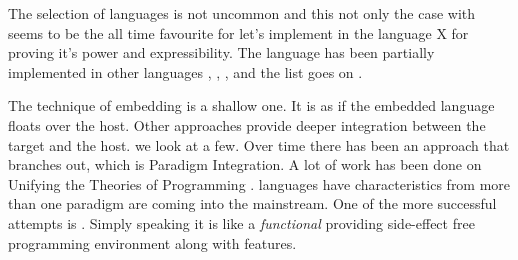 \documentclass[thesis-solanki.tex]{subfiles}
\begin{document}
The selection of languages is not uncommon and this not only the case with  seems 
to be the all time favourite for let's implement  in the language X for proving it's power and 
expressibility. The  language has been partially implemented \cite{swipembedd} in other 
languages   \cite{racklog},   
\cite{komorowski1982qlog,robinson1982loglisp,robinson1980loglisp},  \cite{wikiprolog, jlog}, 
 \cite{jscriptlog} and the list \cite{yieldprolog} goes on .

The technique of embedding is a shallow one.
It is as if the embedded language floats over the host.
Other approaches provide deeper integration between the target and the host.
we look at a few.
Over time there has been an approach that branches out, which is Paradigm Integration.
A lot of work has been done on Unifying the Theories of Programming
\cite{DBLP:conf/utp/2006,DBLP:conf/utp/2008,DBLP:conf/utp/2010,DBLP:conf/utp/2012,hoare1998unifying,
  gibbons2013unifying}.
 languages  have characteristics from more than one paradigm are coming into the
mainstream.
One of the more successful attempts is . Simply speaking it is like a \textit{functional} 
 providing side-effect free programming environment along with 
 features.
\end{document}

